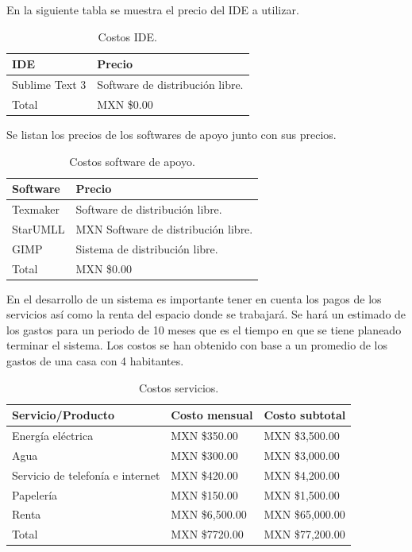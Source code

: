 \documentclass[12pt]{report}
\begin{document}
En la siguiente tabla se muestra el precio del IDE a utilizar.
\begin{table}[H]
\begin{center}
\begin{tabular}{|p{40mm}|p{40mm}|}
\hline
IDE & Precio \\
\hline \hline 
Sublime Text 3 & Software de distribución libre.\cite{subli}\\
\hline \hline
Total & MXN \$0.00\\
\hline
\end{tabular}
\caption{Costos IDE.}
\end{center}
\end{table}

Se listan los precios de los softwares de apoyo junto con sus precios.

\begin{table}[H]
\begin{center}
\begin{tabular}{|p{40mm}|p{40mm}|}
\hline
Software & Precio \\
\hline \hline 
Texmaker & Software de distribución libre.\cite{texm}\\
\hline
StarUMLL & MXN Software de distribución libre.\cite{star}\\
\hline
GIMP & Sistema de distribución libre.\cite{gimp}\\
\hline \hline
Total & MXN \$0.00\\
\hline
\end{tabular}
\caption{Costos software de apoyo.}
\end{center}
\end{table}

En el desarrollo de un sistema es importante tener en cuenta los pagos de los servicios así como la renta del espacio donde se trabajará. Se hará un estimado de los gastos para un periodo de 10 meses que es el tiempo en que se tiene planeado terminar el sistema. Los costos se han obtenido con base a un promedio de los gastos de una casa con 4 habitantes.
\begin{table}[H]
\begin{center}
\begin{tabular}{|p{40mm}|p{40mm}|p{40mm}|}
\hline
Servicio/Producto & Costo mensual & Costo subtotal \\
\hline \hline 
Energía eléctrica & MXN \$350.00 & MXN \$3,500.00\\
\hline
Agua & MXN \$300.00 & MXN \$3,000.00\\
\hline
Servicio de telefonía e internet & MXN \$420.00 & MXN \$4,200.00 \\
\hline
Papelería & MXN \$150.00 & MXN \$1,500.00\\
\hline
Renta & MXN \$6,500.00 & MXN \$65,000.00 \\
\hline \hline
Total & MXN \$7720.00 & MXN \$77,200.00\\
\hline
\end{tabular}
\caption{Costos servicios.}
\end{center}
\end{table}
\end{document}
